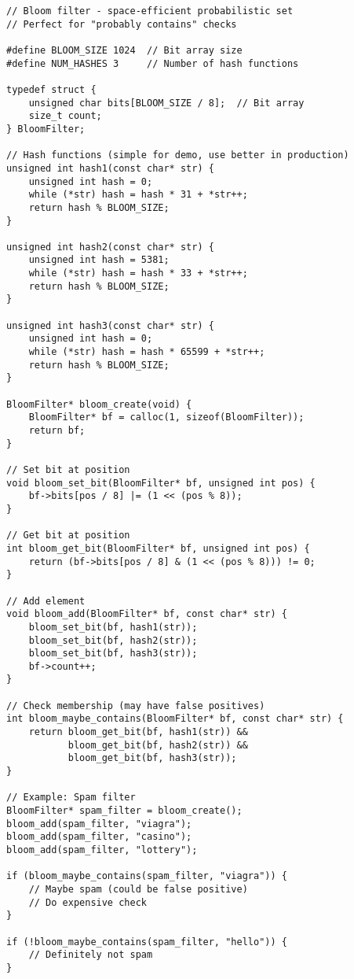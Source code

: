 \begin{lstlisting}
// Bloom filter - space-efficient probabilistic set
// Perfect for "probably contains" checks

#define BLOOM_SIZE 1024  // Bit array size
#define NUM_HASHES 3     // Number of hash functions

typedef struct {
    unsigned char bits[BLOOM_SIZE / 8];  // Bit array
    size_t count;
} BloomFilter;

// Hash functions (simple for demo, use better in production)
unsigned int hash1(const char* str) {
    unsigned int hash = 0;
    while (*str) hash = hash * 31 + *str++;
    return hash % BLOOM_SIZE;
}

unsigned int hash2(const char* str) {
    unsigned int hash = 5381;
    while (*str) hash = hash * 33 + *str++;
    return hash % BLOOM_SIZE;
}

unsigned int hash3(const char* str) {
    unsigned int hash = 0;
    while (*str) hash = hash * 65599 + *str++;
    return hash % BLOOM_SIZE;
}

BloomFilter* bloom_create(void) {
    BloomFilter* bf = calloc(1, sizeof(BloomFilter));
    return bf;
}

// Set bit at position
void bloom_set_bit(BloomFilter* bf, unsigned int pos) {
    bf->bits[pos / 8] |= (1 << (pos % 8));
}

// Get bit at position
int bloom_get_bit(BloomFilter* bf, unsigned int pos) {
    return (bf->bits[pos / 8] & (1 << (pos % 8))) != 0;
}

// Add element
void bloom_add(BloomFilter* bf, const char* str) {
    bloom_set_bit(bf, hash1(str));
    bloom_set_bit(bf, hash2(str));
    bloom_set_bit(bf, hash3(str));
    bf->count++;
}

// Check membership (may have false positives)
int bloom_maybe_contains(BloomFilter* bf, const char* str) {
    return bloom_get_bit(bf, hash1(str)) &&
           bloom_get_bit(bf, hash2(str)) &&
           bloom_get_bit(bf, hash3(str));
}

// Example: Spam filter
BloomFilter* spam_filter = bloom_create();
bloom_add(spam_filter, "viagra");
bloom_add(spam_filter, "casino");
bloom_add(spam_filter, "lottery");

if (bloom_maybe_contains(spam_filter, "viagra")) {
    // Maybe spam (could be false positive)
    // Do expensive check
}

if (!bloom_maybe_contains(spam_filter, "hello")) {
    // Definitely not spam
}
\end{lstlisting}

